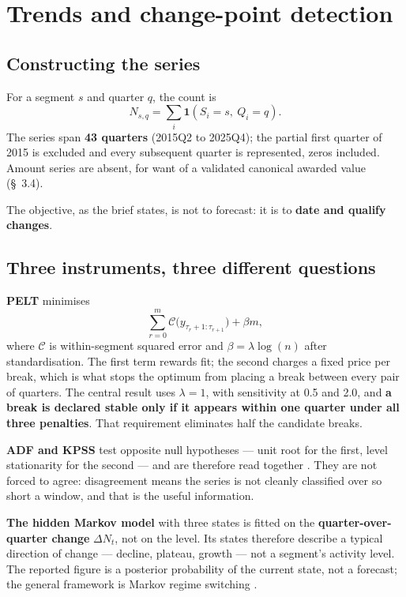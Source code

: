 \section{Trends and change-point detection}

\subsection{Constructing the series}

For a segment \(s\) and quarter \(q\), the count is
\[N_{s,q} = \sum_i \mathbf{1}(S_i = s,\ Q_i = q).\]
The series span \textbf{43 quarters} (2015Q2 to 2025Q4); the partial first quarter of 2015 is excluded and every subsequent quarter is represented, zeros included. Amount series are absent, for want of a validated canonical awarded value (\S~3.4).

The objective, as the brief states, is not to forecast: it is to \textbf{date and qualify changes}.

\subsection{Three instruments, three different questions}

\textbf{PELT} \citep{killick2012} minimises
\[\sum_{r=0}^{m}\mathcal{C}\big(y_{\tau_r+1:\tau_{r+1}}\big) + \beta m,\]
where \(\mathcal{C}\) is within-segment squared error and \(\beta = \lambda\log(n)\) after standardisation. The first term rewards fit; the second charges a fixed price per break, which is what stops the optimum from placing a break between every pair of quarters. The central result uses \(\lambda = 1\), with sensitivity at 0.5 and 2.0, and \textbf{a break is declared stable only if it appears within one quarter under all three penalties}. That requirement eliminates half the candidate breaks.

\textbf{ADF and KPSS} test opposite null hypotheses --- unit root for the first, level stationarity for the second --- and are therefore read together \citep{dickey1979,kwiatkowski1992}. They are not forced to agree: disagreement means the series is not cleanly classified over so short a window, and that is the useful information.

\textbf{The hidden Markov model} with three states is fitted on the \textbf{quarter-over-quarter change} \(\Delta N_t\), not on the level. Its states therefore describe a typical direction of change --- decline, plateau, growth --- not a segment's activity level. The reported figure is a posterior probability of the current state, not a forecast; the general framework is Markov regime switching \citep{hamilton1989}.

